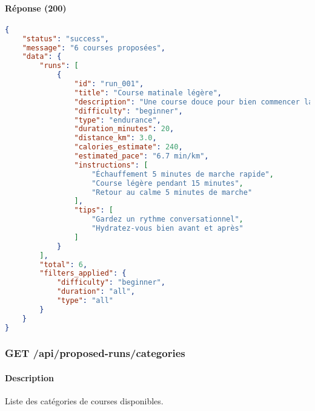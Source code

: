 \paragraph{Réponse (200)}
\begin{lstlisting}[language=json]
{
    "status": "success",
    "message": "6 courses proposées",
    "data": {
        "runs": [
            {
                "id": "run_001",
                "title": "Course matinale légère",
                "description": "Une course douce pour bien commencer la journée",
                "difficulty": "beginner",
                "type": "endurance",
                "duration_minutes": 20,
                "distance_km": 3.0,
                "calories_estimate": 240,
                "estimated_pace": "6.7 min/km",
                "instructions": [
                    "Échauffement 5 minutes de marche rapide",
                    "Course légère pendant 15 minutes",
                    "Retour au calme 5 minutes de marche"
                ],
                "tips": [
                    "Gardez un rythme conversationnel",
                    "Hydratez-vous bien avant et après"
                ]
            }
        ],
        "total": 6,
        "filters_applied": {
            "difficulty": "beginner",
            "duration": "all",
            "type": "all"
        }
    }
}
\end{lstlisting}

\subsubsection{GET /api/proposed-runs/categories}

\paragraph{Description}
Liste des catégories de courses disponibles.

